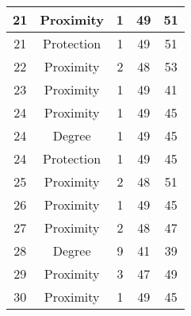 \documentclass[results.tex]{subfiles}
\begin{document}
\begin{center}
\begin{tabular}{| c || c | c | c | c |}
            \hline
            21                      & Proximity                    & 1                      & 49                      & 51                   \\
            \hline
            21                      & Protection                   & 1                      & 49                      & 51                   \\
            \hline
            22                      & Proximity                    & 2                      & 48                      & 53                   \\
            \hline
            23                      & Proximity                    & 1                      & 49                      & 41                   \\
            \hline
            24                      & Proximity                    & 1                      & 49                      & 45                   \\
            \hline
            24                      & Degree                       & 1                      & 49                      & 45                   \\
            \hline
            24                      & Protection                   & 1                      & 49                      & 45                   \\
            \hline
            25                      & Proximity                    & 2                      & 48                      & 51                   \\
            \hline
            26                      & Proximity                    & 1                      & 49                      & 45                   \\
            \hline
            27                      & Proximity                    & 2                      & 48                      & 47                   \\
            \hline
            28                      & Degree                       & 9                      & 41                      & 39                   \\
            \hline
            29                      & Proximity                    & 3                      & 47                      & 49                   \\
            \hline
            30                      & Proximity                    & 1                      & 49                      & 45                   \\

\end{tabular}
\end{center}
\end{document}
